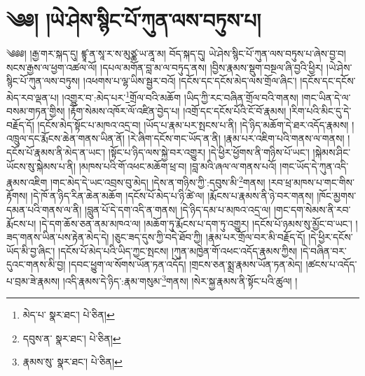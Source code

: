 \setcounter{footnote}{0} 
\chapter{༄༅། །ཡེ་ཤེས་སྙིང་པོ་ཀུན་ལས་བཏུས་པ།}༄༅༅། །རྒྱ་གར་སྐད་དུ། ཛྙཱ་ན་སཱ་ར་ས་མུཙྪ་ཡ་ནཱ་མ། བོད་སྐད་དུ། ཡེ་ཤེས་སྙིང་པོ་ཀུན་ལས་བཏུས་པ་ཞེས་བྱ་བ། སངས་རྒྱས་ལ་ཕྱག་འཚལ་ལོ། །དཔལ་མགོན་བླ་མ་ལ་བཏུད་ནས། །བྱིས་རྣམས་སྡུག་བསྔལ་ཞི་བྱའི་ཕྱིར། །ཡེ་ཤེས་སྙིང་པོ་ཀུན་ལས་བཏུས། །འཕགས་པ་ལྷ་ཡིས་སྦྱར་བའོ། །དངོས་དང་དངོས་མེད་ལས་གྲོལ་ཞིང་། །དངོས་དང་དངོས་མེད་རབ་ལྡན་པ། །འགྱུར་བ་:མེད་པར་\footnote{མེད་པ་  སྣར་ཐང་།  པེ་ཅིན། }གྲོལ་བའི་མཆོག །ཡིད་ཀྱི་རང་བཞིན་གྲོལ་བའི་གནས། །གང་ཡིན་དེ་ལ་བསམ་གཏན་གྱིས། །རྟོག་སེམས་འཁོར་ལོ་འཛིན་བྱེད་པ། །འགྲོ་དང་དངོས་པོའི་ངོ་བོ་རྣམས། །རིག་པའི་མིང་དུ་དེ་བརྗོད་དོ། །དངོས་མེད་སྟོང་པ་མཁའ་འདྲ་བ། །ཡོད་པ་རྣམ་པར་སྤངས་པ་ནི། །དེ་ཉིད་མཆོག་དེ་ཐར་འདོད་རྣམས། །འཁྲུལ་དང་རྨོངས་ཆེན་གནས་ཡིན་ནོ། །རེ་ཞིག་དངོས་གང་ཡོད་ན་ནི། །རྣམ་པར་འཇིག་པའི་གནས་ལ་གནས། །དངོས་པོ་རྣམས་ནི་མེད་ན་ཡང་། །སྟོང་པ་ཉིད་ལས་སྐྱེ་བར་འགྱུར། །དེ་ཕྱིར་ཕྱོགས་ནི་གཉིས་པོ་ཡང་། །སྐེམས་ཤིང་ཡོངས་སུ་སྐེམས་པ་ནི། །མཁས་པའི་གོ་འཕང་མཆོག་ཕྲ་བ། །བླ་མའི་ཞལ་ལ་གནས་པའོ། །གང་ཡོད་དེ་ཀུན་འདི་རྣམས་འཇིག །གང་མེད་དེ་ཡང་འབྲས་བུ་མེད། །དེས་ན་གཉིས་ཀྱི་:དབུས་མི་\footnote{དབུས་ན་  སྣར་ཐང་།  པེ་ཅིན། }གནས། །རབ་ཕྲ་མཁས་པ་གང་གིས་རྟོགས། །དེ་ཁོ་ན་ཉིད་རིན་ཆེན་མཆོག །དངོས་པོ་མེད་པ་ཉི་ཚེ་ལ། །རྨོངས་པ་རྣམས་ནི་ཉེ་བར་གནས། །ཁོང་མྱགས་དམན་པའི་གནས་ལ་ནི། །བླུན་པོ་དེ་དག་འདི་ན་གནས། །དེ་ཉིད་དམ་པ་མཁའ་འདྲ་ལ། །གང་དག་སེམས་ནི་རབ་རྨོངས་པ། །དེ་དག་ཆོས་ཅན་ནམ་མཁའ་ལ། །མཆོག་ཏུ་རྨོངས་པ་དག་ཏུ་འགྱུར། །དངོས་པོ་ཉམས་སུ་མྱོང་བ་ཡང་། །ཟད་གནས་ཡིན་པས་རྟེན་མེད་དེ། །ཅུང་ཟད་དུས་ཀྱི་བདེ་ཐོབ་ཀྱི། །རྣམ་པར་གྲོལ་བར་མི་བརྗོད་དོ། །དེ་ཕྱིར་དངོས་ཡོད་མི་བྱ་ཞིང་། །དངོས་པོ་མེད་པའི་ཡིད་ཀྱང་སྤངས། །ཀུན་མཁྱེན་གོ་འཕང་འདོད་རྣམས་ཀྱིས། །དེ་བཞིན་བར་དུའང་གནས་མི་བྱ། །དབང་ཕྱུག་ལ་སོགས་ཡོན་ཏན་འདོད། །གྲངས་ཅན་སྨྲ་རྣམས་ཡོན་ཏན་མེད། །ཚངས་པ་འདོད་པ་བྲམ་ཟེ་རྣམས། །འདི་རྣམས་དེ་ཉིད་:རྣམ་གསུམ་\footnote{རྣམས་སུ་  སྣར་ཐང་།  པེ་ཅིན། }གནས། །སེར་སྐྱ་རྣམས་ནི་སྟོང་པའི་ཚུལ། །
